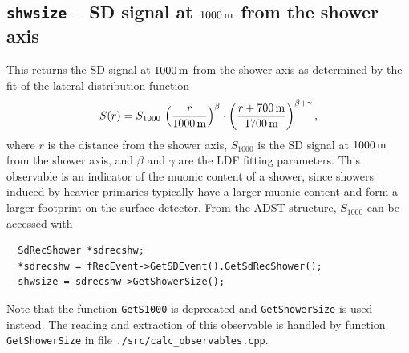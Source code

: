 \documentclass[12pt,a4paper]{report}
\begin{document}
\subsection{\texttt{shwsize} -- SD signal at $\unit[1000]{m}$ from the shower axis}
This returns the SD signal at $\unit[1000]{m}$ from the shower axis as determined by the fit of the lateral distribution function
\begin{equation} \label{eq:ldfFunction}
S(r) = S_{1000}\, \left(\frac{r}{\unit[1000]{m}}\right)^{\beta}\cdot \left(\frac{r + \unit[700]{m}}{\unit[1700]{m}}\right)^{\beta + \gamma},
\end{equation}
where $r$ is the distance from the shower axis, $S_{1000}$ is the SD signal at $\unit[1000]{m}$ from the shower axis, and $\beta$ and $\gamma$ are the LDF fitting parameters. This observable is an indicator of the muonic content of a shower, since showers induced by heavier primaries typically have a larger muonic content and form a larger footprint on the surface detector. From the ADST structure, $S_{1000}$ can be accessed with
\begin{verbatim}
  SdRecShower *sdrecshw;
  *sdrecshw = fRecEvent->GetSDEvent().GetSdRecShower();
  shwsize = sdrecshw->GetShowerSize();
\end{verbatim}
Note that the function \texttt{GetS1000} is deprecated and \texttt{GetShowerSize} is used instead. The reading and extraction of this observable is handled by function \texttt{GetShowerSize} in file \texttt{./src/calc\_observables.cpp}.
\end{document}
